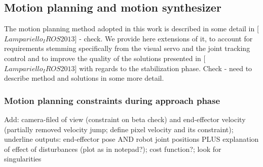 %
%
%
%
\subsection{Motion planning and motion synthesizer}
%
The motion planning method adopted in this work is described in some detail in [$Lampariello_IROS2013$] - check. We provide here extensions of it, to account for requirements stemming specifically from the visual servo and the joint tracking control and to improve the quality of the solutions presented in [$Lampariello_IROS2013$] with regards to the stabilization phase. Check - need to describe method and solutions in some more detail.

\subsubsection{Motion planning constraints during approach phase}
%

Add: camera-filed of view (constraint on beta check) and end-effector velocity (partially removed velocity jump; define pixel velocity and its constraint); underline outputs: end-effector pose AND robot joint positions PLUS explanation of effect of disturbances (plot as in notepad?); cost function?; look for singularities

